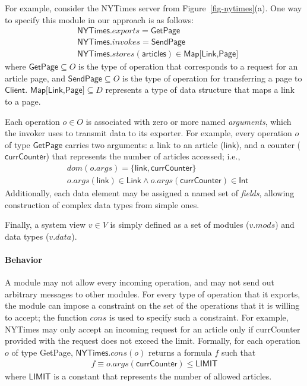 For example, consider the \textsf{NYTimes} server from
Figure~\ref{fig-nytimes}(a). One way to specify this module in our
approach is as follows:
\begin{align*}
&\textsf{NYTimes}.exports = \textsf{GetPage}\\
&\textsf{NYTimes}.invokes = \textsf{SendPage}\\
&\textsf{NYTimes}.stores(\textsf{articles}) \in
\textsf{Map[Link,Page]}
\end{align*}
where $\textsf{GetPage} \subseteq O$ is the type of operation that
corresponds to a request for an article page, and $\textsf{SendPage}
\subseteq O$ is the type of operation for transferring a page to
$\textsf{Client}$. $\textsf{Map[Link,Page]} \subseteq D$ represents a
type of data structure that maps a link to a page.

Each operation $o \in O$ is associated with zero or more named
\textit{arguments}, which the invoker uses to transmit data to its
exporter. For example, every operation $o$ of type
$\textsf{GetPage}$ carries two arguments: a link to an article
($\textsf{link}$), and a counter ($\textsf{currCounter}$) that
represents the number of articles accessed; i.e.,
\begin{align*}
  &dom(o.args) = \{ \textsf{link}, \textsf{currCounter} \} \\
  &o.args(\textsf{link}) \in \textsf{Link} \land
  o.args(\textsf{currCounter}) \in \textsf{Int}
\end{align*}
Additionally, each data element may be assigned a named set of
\textit{fields}, allowing construction of complex data types from
simple ones.

Finally, a system view $v \in V$ is simply defined as a set of modules
($v.mods$) and data types ($v.data$). 

\paragraph{\textbf{Behavior}} A module may not allow every incoming
operation, and may not send out arbitrary messages to other
modules. For every type of operation that it exports, the module can
impose a constraint on the set of the operations that it is willing to
accept; the function $cons$ is used to specify such a constraint. For
example, \textsf{NYTimes} may only accept an incoming request for an
article only if \textsf{currCounter} provided with the request does
not exceed the limit. Formally, for each operation $o$ of type
\textsf{GetPage}, $\textsf{NYTimes}.cons(o)$ returns a formula $f$
such that
\begin{align*}
f \equiv o.args(\textsf{currCounter}) \leq \textsf{LIMIT}
\end{align*}
where $\textsf{LIMIT}$ is a constant that represents the number of
allowed articles.

